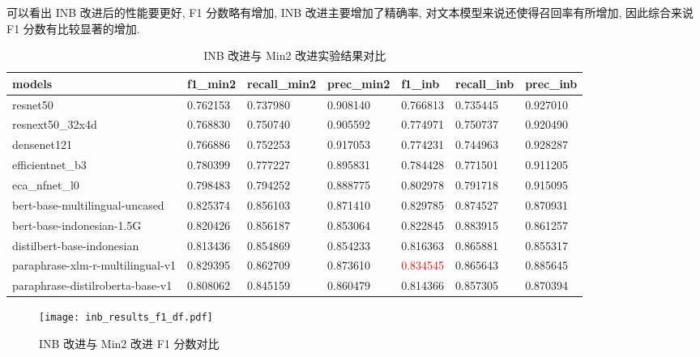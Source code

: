 \documentclass[12pt]{article}
\begin{document}
可以看出 INB 改进后的性能要更好, F1 分数略有增加, INB 改进主要增加了精确率, 对文本模型来说还使得召回率有所增加, 因此综合来说 F1 分数有比较显著的增加.

\begin{table}[htbp]
  \centering
  \footnotesize
  \caption{INB 改进与 Min2 改进实验结果对比}
  \label{tab:inb_results}
  \begin{tabular}{lllllll}
    \toprule
    models                           & f1\_min2 & recall\_min2 & prec\_min2      & f1\_inb  & recall\_inb & prec\_inb \\
    \midrule
    resnet50                         & 0.762153 & 0.737980     & 0.908140        & 0.766813 & 0.735445    & 0.927010       \\
    resnext50\_32x4d                 & 0.768830 & 0.750740     & 0.905592        & 0.774971 & 0.750737    & 0.920490       \\
    densenet121                      & 0.766886 & 0.752253     & 0.917053        & 0.774231 & 0.744963    & 0.928287       \\
    efficientnet\_b3                 & 0.780399 & 0.777227     & 0.895831        & 0.784428 & 0.771501    & 0.911205       \\
    eca\_nfnet\_l0                   & 0.798483 & 0.794252     & 0.888775        & 0.802978 & 0.791718    & 0.915095       \\
    bert-base-multilingual-uncased   & 0.825374 & 0.856103     & 0.871410        & 0.829785 & 0.874527    & 0.870931       \\
    bert-base-indonesian-1.5G        & 0.820426 & 0.856187     & 0.853064        & 0.822845 & 0.883915    & 0.861257       \\
    distilbert-base-indonesian       & 0.813436 & 0.854869     & 0.854233        & 0.816363 & 0.865881    & 0.855317       \\
    paraphrase-xlm-r-multilingual-v1 & 0.829395 & 0.862709     & 0.873610        & \textcolor{red}{0.834545} & 0.865643    & 0.885645       \\
    paraphrase-distilroberta-base-v1 & 0.808062 & 0.845159     & 0.860479        & 0.814366 & 0.857305    & 0.870394       \\
    \bottomrule
  \end{tabular}
\end{table}

\begin{figure}[htbp]
  \centering
  \texttt{[image: inb\_results\_f1\_df.pdf]}
  \caption{INB 改进与 Min2 改进 F1 分数对比}
  \label{fig:inb_results_f1}
\end{figure}
\end{document}
